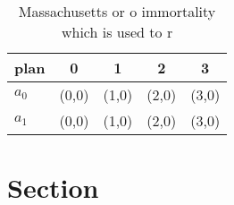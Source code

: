 \documentclass[a4paper]{article}
\begin{document}
\begin{table}
\begin{adjustbox}{width=0.7\columnwidth}
\begin{tabular}{|l|l|l|l|l|}
\hline
\textbf{plan} & \multicolumn{1}{c|}{\textbf{0}} & \multicolumn{1}{c|}{\textbf{1}} & \multicolumn{1}{c|}{\textbf{2}} & \multicolumn{1}{c|}{\textbf{3}} \\ \hline
\textbf{$a_0$}  & (0,0) & (1,0) & (2,0) & (3,0) \\ \hline
\textbf{$a_1$}  & (0,0) & (1,0) & (2,0) & (3,0) \\ \hline
\end{tabular}
\end{adjustbox}
\caption{Massachusetts or o immortality which is used to r
}
\end{table}

\section{Section}
\end{document}
